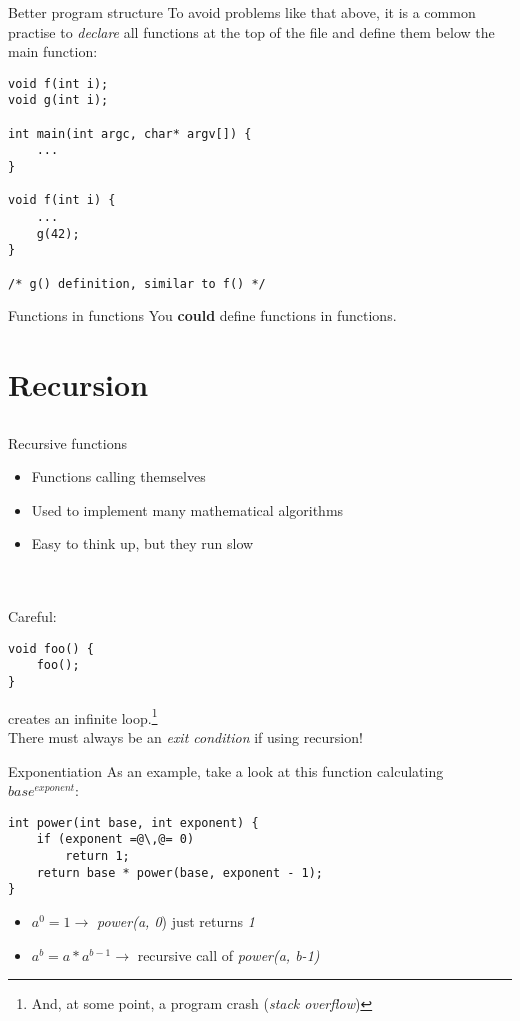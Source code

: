 \begin{frame}[fragile]{Better program structure}
	To avoid problems like that above, it is a common practise to \textit{declare} all functions at the top of the file and define them below the main function:
	\begin{lstlisting}
void f(int i);
void g(int i);

int main(int argc, char* argv[]) {
	...
}

void f(int i) {
	...
	g(42);
}

/* g() definition, similar to f() */
\end{lstlisting}
\end{frame}
\begin{frame}{Functions in functions}
	You \textbf{could} define functions in functions.\footnotemark
	
\end{frame}
\section{Recursion}
\subsection{}
\begin{frame}[fragile]{Recursive functions}
	\begin{itemize}
		\item Functions calling themselves
		\item Used to implement many mathematical algorithms
		\item Easy to think up, but they run slow
	\end{itemize} \ \\ \ \\
	Careful:
	\begin{lstlisting}
void foo() {
	foo();
}
\end{lstlisting}
	creates an infinite loop.\footnote{And, at some point, a program crash (\textit{stack overflow})} \\
	There must always be an \textit{exit condition} if using recursion!
\end{frame}
\begin{frame}[fragile]{Exponentiation}
As an example, take a look at this function calculating $base^{exponent}$:
	\begin{lstlisting}
int power(int base, int exponent) {
	if (exponent =@\,@= 0)
		return 1;
	return base * power(base, exponent - 1);
}
\end{lstlisting}
	\begin{itemize}
		\item $a^{0} = 1 \rightarrow$ \textit{power(a, 0}) just returns \textit{1}
		\item $a^{b} = a * a^{b-1} \rightarrow$ recursive call of \textit{power(a, b-1)}
	\end{itemize}
\end{frame}
